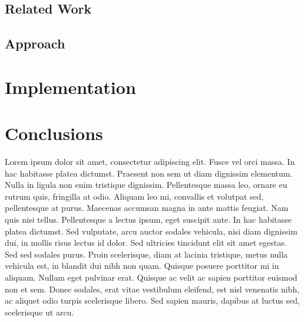 \documentclass[botnum,fleqn,final]{unmeethesis}
\begin{document}
\section{\label{section:intro:rw}Related Work}

\section{\label{section:intro:approach}Approach}

\chapter{\label{chapter:impl}Implementation}

\chapter{\label{chapter:conc}Conclusions}

Lorem ipsum dolor sit amet, consectetur adipiscing elit. Fusce vel orci massa.
In hac habitasse platea dictumst. Praesent non sem ut diam dignissim elementum.
Nulla in ligula non enim tristique dignissim. Pellentesque massa leo, ornare eu
rutrum quis, fringilla at odio. Aliquam leo mi, convallis et volutpat sed,
pellentesque at purus. Maecenas accumsan magna in ante mattis feugiat. Nam quis
nisi tellus. Pellentesque a lectus ipsum, eget suscipit ante. In hac habitasse
platea dictumst. Sed vulputate, arcu auctor sodales vehicula, nisi diam
dignissim dui, in mollis risus lectus id dolor. Sed ultricies tincidunt elit
sit amet egestas. Sed sed sodales purus. Proin scelerisque, diam at lacinia
tristique, metus nulla vehicula est, in blandit dui nibh non quam. Quisque
posuere porttitor mi in aliquam. Nullam eget pulvinar erat. Quisque ac velit ac
sapien porttitor euismod non et sem. Donec sodales, erat vitae vestibulum
eleifend, est nisl venenatis nibh, ac aliquet odio turpis scelerisque libero.
Sed sapien mauris, dapibus at luctus sed, scelerisque ut arcu.
\end{document}
